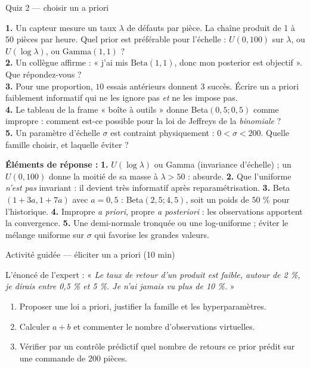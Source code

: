 \begin{frame}{Quiz 2 — choisir un a priori}
\small
\begin{qbox}
\textbf{1.} Un capteur mesure un taux $\lambda$ de défauts par pièce. La chaîne
produit de 1 à 50 pièces par heure. Quel prior est préférable pour l'échelle :
$U(0, 100)$ sur $\lambda$, ou $U(\log \lambda)$, ou $\mathrm{Gamma}(1,1)$ ? \\[1mm]
\textbf{2.} Un collègue affirme : « j'ai mis $\mathrm{Beta}(1,1)$, donc mon
posterior est objectif ». Que répondez-vous ? \\[1mm]
\textbf{3.} Pour une proportion, $10$ essais antérieurs donnent $3$ succès.
Écrire un a priori faiblement informatif qui ne les ignore pas \emph{et} ne les
impose pas. \\[1mm]
\textbf{4.} Le tableau de la frame « boîte à outils » donne Beta$(0{,}5;0{,}5)$
comme impropre : comment est-ce possible pour la loi de Jeffreys de la
\emph{binomiale} ? \\[1mm]
\textbf{5.} Un paramètre d'échelle $\sigma$ est contraint physiquement :
$0 < \sigma < 200$. Quelle famille choisir, et laquelle éviter ?
\vspace{1.5mm}

\textcolor{byBlue}{\textbf{Éléments de réponse :}}
\textbf{1.} $U(\log\lambda)$ ou Gamma (invariance d'échelle) ;
un $U(0,100)$ donne la moitié de sa masse à $\lambda > 50$ : absurde.
\quad
\textbf{2.} Que l'uniforme \emph{n'est pas} invariant : il devient très informatif
après reparamétrisation.
\quad
\textbf{3.} Beta$(1+3a, 1+7a)$ avec $a = 0{,}5$ : Beta$(2{,}5; 4{,}5)$, soit un poids
de $50$ \% pour l'historique.
\quad
\textbf{4.} Impropre \emph{a priori}, propre \emph{a posteriori} : les observations
apportent la convergence.
\quad
\textbf{5.} Une demi-normale tronquée ou une log-uniforme ; éviter le mélange
uniforme sur $\sigma$ qui favorise les grandes valeurs.
\end{qbox}
\end{frame}

\begin{frame}{Activité guidée — éliciter un a priori (10 min)}
\small
\begin{abox}
L'énoncé de l'expert : « \emph{Le taux de retour d'un produit est faible, autour de
2 \%, je dirais entre 0,5 \% et 5 \%. Je n'ai jamais vu plus de 10 \%.} »
\begin{enumerate}
  \item Proposer une loi a priori, justifier la famille et les hyperparamètres.
  \item Calculer $a+b$ et commenter le nombre d'observations virtuelles.
  \item Vérifier par un contrôle prédictif quel nombre de retours ce prior prédit
        sur une commande de $200$ pièces.
\end{enumerate}
\end{abox}
\vspace{1mm}
\end{frame}

